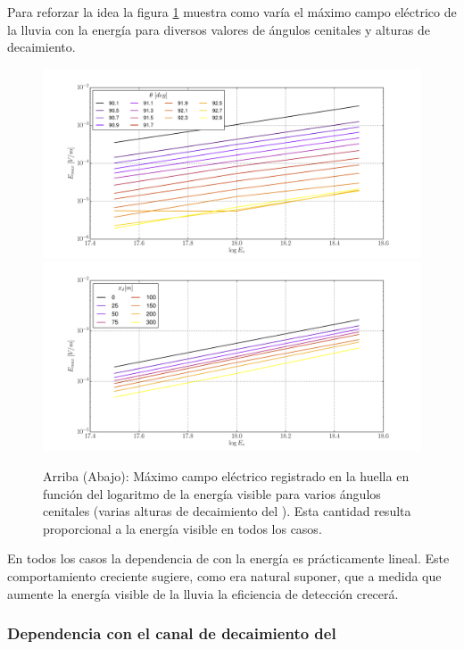 	Para reforzar la idea la figura \ref{fig:ev_dependence2} muestra como var\'ia el m\'aximo campo el\'ectrico de la lluvia con la energ\'ia para diversos valores de \'angulos cenitales y alturas de decaimiento.
	\begin{figure}[ht!]
		\centering
		\includegraphics[width=\textwidth]{./fig/simulacionRadio/maxDep/eMaxThEv}
		\includegraphics[width=\textwidth]{./fig/simulacionRadio/maxDep/eMaxXdEv}
		\caption{\label{fig:ev_dependence2}
		Arriba (Abajo): M\'aximo campo el\'ectrico registrado en la huella en funci\'on del logaritmo de la energ\'ia visible para varios \'angulos cenitales (varias alturas de decaimiento del \tauon{}).
		Esta cantidad resulta proporcional a la energ\'ia visible en todos los casos.
		}
	\end{figure}
	En todos los casos la dependencia de con la energ\'ia es pr\'acticamente lineal.
	Este comportamiento creciente sugiere, como era natural suponer, que a medida que aumente la energ\'ia visible de la lluvia la eficiencia de detecci\'on crecer\'a.
	
	
	\subsubsection{Dependencia con el canal de decaimiento del \tauon{}}
	\label{sbsc:decayChRadio}
	
